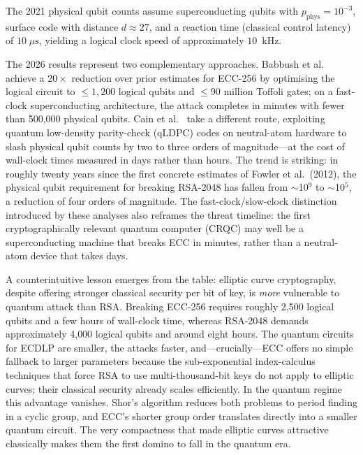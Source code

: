 The 2021 physical qubit counts assume superconducting qubits with $p_\text{phys} = 10^{-3}$, surface code with distance $d \approx 27$, and a reaction time (classical control latency) of $10\;\mu\text{s}$, yielding a logical clock speed of approximately $10$~kHz.

The 2026 results represent two complementary approaches.  Babbush et al.~\cite{BabbushZalcmanGidney2026} achieve a $20\times$ reduction over prior estimates for ECC-256 by optimising the logical circuit to $\leq 1{,}200$ logical qubits and $\leq 90$ million Toffoli gates; on a fast-clock superconducting architecture, the attack completes in minutes with fewer than 500{,}000 physical qubits.  Cain et al.~\cite{CainXuKing2026} take a different route, exploiting quantum low-density parity-check (qLDPC) codes on neutral-atom hardware to slash physical qubit counts by two to three orders of magnitude---at the cost of wall-clock times measured in days rather than hours.  The trend is striking: in roughly twenty years since the first concrete estimates of Fowler et al.\ (2012), the physical qubit requirement for breaking RSA-2048 has fallen from $\sim$10$^{9}$ to $\sim$10$^{5}$, a reduction of four orders of magnitude.  The fast-clock/slow-clock distinction introduced by these analyses also reframes the threat timeline: the first cryptographically relevant quantum computer (CRQC) may well be a superconducting machine that breaks ECC in minutes, rather than a neutral-atom device that takes days.

A counterintuitive lesson emerges from the table: elliptic curve cryptography, despite offering stronger classical security per bit of key, is \emph{more} vulnerable to quantum attack than RSA.  Breaking ECC-256 requires roughly 2{,}500 logical qubits and a few hours of wall-clock time, whereas RSA-2048 demands approximately 4{,}000 logical qubits and around eight hours.  The quantum circuits for ECDLP are smaller, the attacks faster, and---crucially---ECC offers no simple fallback to larger parameters because the sub-exponential index-calculus techniques that force RSA to use multi-thousand-bit keys do not apply to elliptic curves; their classical security already scales efficiently.  In the quantum regime this advantage vanishes.  Shor's algorithm reduces both problems to period finding in a cyclic group, and ECC's shorter group order translates directly into a smaller quantum circuit.  The very compactness that made elliptic curves attractive classically makes them the first domino to fall in the quantum era.

